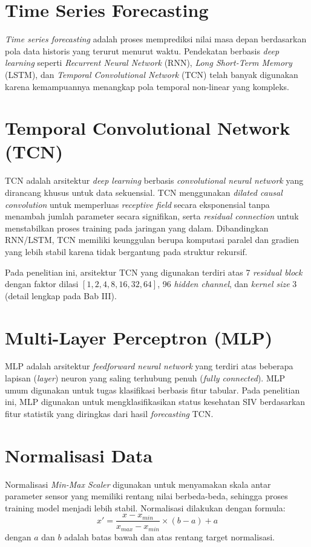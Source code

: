 \documentclass[12pt,a4paper]{report}
\begin{document}
\section{Time Series Forecasting}
\textit{Time series forecasting} adalah proses memprediksi nilai masa depan berdasarkan pola data historis yang terurut menurut waktu. Pendekatan berbasis \textit{deep learning} seperti \textit{Recurrent Neural Network} (RNN), \textit{Long Short-Term Memory} (LSTM), dan \textit{Temporal Convolutional Network} (TCN) telah banyak digunakan karena kemampuannya menangkap pola temporal non-linear yang kompleks.

\section{Temporal Convolutional Network (TCN)}
TCN adalah arsitektur \textit{deep learning} berbasis \textit{convolutional neural network} yang dirancang khusus untuk data sekuensial. TCN menggunakan \textit{dilated causal convolution} untuk memperluas \textit{receptive field} secara eksponensial tanpa menambah jumlah parameter secara signifikan, serta \textit{residual connection} untuk menstabilkan proses training pada jaringan yang dalam. Dibandingkan RNN/LSTM, TCN memiliki keunggulan berupa komputasi paralel dan gradien yang lebih stabil karena tidak bergantung pada struktur rekursif.

Pada penelitian ini, arsitektur TCN yang digunakan terdiri atas 7 \textit{residual block} dengan faktor dilasi $[1, 2, 4, 8, 16, 32, 64]$, 96 \textit{hidden channel}, dan \textit{kernel size} 3 (detail lengkap pada Bab III).

\section{Multi-Layer Perceptron (MLP)}
MLP adalah arsitektur \textit{feedforward neural network} yang terdiri atas beberapa lapisan (\textit{layer}) neuron yang saling terhubung penuh (\textit{fully connected}). MLP umum digunakan untuk tugas klasifikasi berbasis fitur tabular. Pada penelitian ini, MLP digunakan untuk mengklasifikasikan status kesehatan SIV berdasarkan fitur statistik yang diringkas dari hasil \textit{forecasting} TCN.

\section{Normalisasi Data}
Normalisasi \textit{Min-Max Scaler} digunakan untuk menyamakan skala antar parameter sensor yang memiliki rentang nilai berbeda-beda, sehingga proses training model menjadi lebih stabil. Normalisasi dilakukan dengan formula:
\begin{equation}
    x' = \frac{x - x_{min}}{x_{max} - x_{min}} \times (b - a) + a
\end{equation}
dengan $a$ dan $b$ adalah batas bawah dan atas rentang target normalisasi.
\end{document}
